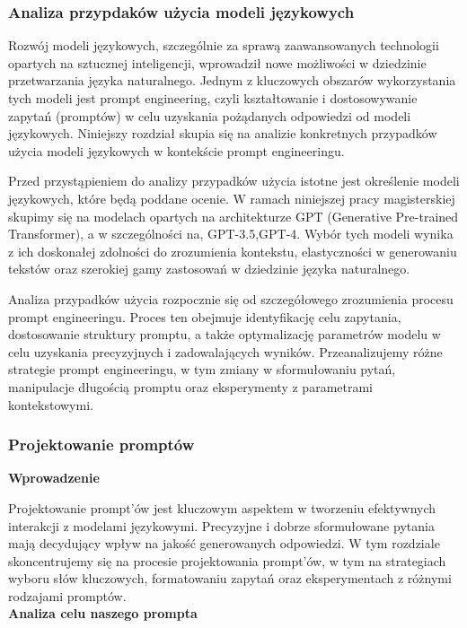 \subsubsection{Analiza przypdaków użycia modeli językowych}

Rozwój modeli językowych, szczególnie za sprawą zaawansowanych technologii opartych na sztucznej inteligencji, wprowadził nowe możliwości w dziedzinie przetwarzania języka naturalnego. Jednym z kluczowych obszarów wykorzystania tych modeli jest prompt engineering, czyli kształtowanie i dostosowywanie zapytań (promptów) w celu uzyskania pożądanych odpowiedzi od modeli językowych. Niniejszy rozdział skupia się na analizie konkretnych przypadków użycia modeli językowych w kontekście prompt engineeringu.

Przed przystąpieniem do analizy przypadków użycia istotne jest określenie modeli językowych, które będą poddane ocenie. W ramach niniejszej pracy magisterskiej skupimy się na modelach opartych na architekturze GPT (Generative Pre-trained Transformer), a w szczególności na, GPT-3.5,GPT-4. Wybór tych modeli wynika z ich doskonałej zdolności do zrozumienia kontekstu, elastyczności w generowaniu tekstów oraz szerokiej gamy zastosowań w dziedzinie języka naturalnego.
 
Analiza przypadków użycia rozpocznie się od szczegółowego zrozumienia procesu prompt engineeringu. Proces ten obejmuje identyfikację celu zapytania, dostosowanie struktury promptu, a także optymalizację parametrów modelu w celu uzyskania precyzyjnych i zadowalających wyników. Przeanalizujemy różne strategie prompt engineeringu, w tym zmiany w sformułowaniu pytań, manipulacje długością promptu oraz eksperymenty z parametrami kontekstowymi.

\subsubsection{Projektowanie promptów}

\noindent\textbf{Wprowadzenie}

Projektowanie prompt'ów jest kluczowym aspektem w tworzeniu efektywnych interakcji z modelami językowymi. Precyzyjne i dobrze sformułowane pytania mają decydujący wpływ na jakość generowanych odpowiedzi. W tym rozdziale skoncentrujemy się na procesie projektowania prompt'ów, w tym na strategiach wyboru słów kluczowych, formatowaniu zapytań oraz eksperymentach z różnymi rodzajami promptów.
\\

\noindent\textbf{Analiza celu naszego prompta}

